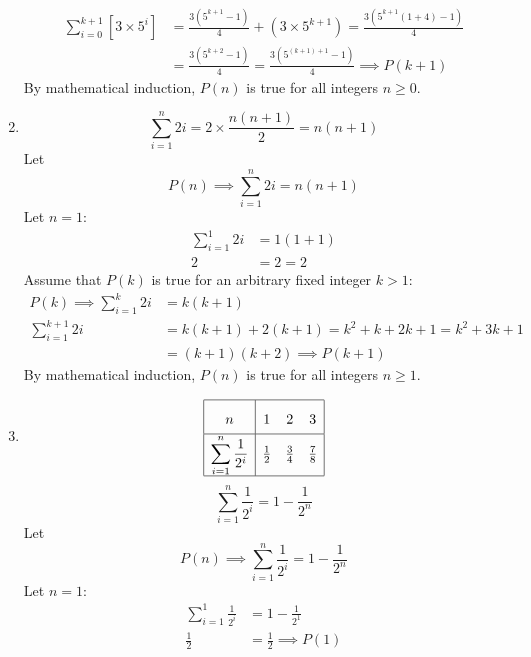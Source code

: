 \documentclass[12pt, A4]{article}
\begin{document}
\begin{enumerate}
\begin{align*}
							\sum_{i = 0}^{k + 1}\left[3 \times 5^i\right] &= \frac{3\left(5^{k + 1} - 1\right)}{4} + \left(3 \times 5^{k + 1}\right)
									= \frac{3\left(5^{k + 1}\left(1 + 4\right) - 1\right)}{4} \\
								&= \frac{3\left(5^{k + 2} - 1\right)}{4}
										= \frac{3\left(5^{(k + 1) + 1} - 1\right)}{4} 
										\implies P(k + 1)
						\end{align*}
						By mathematical induction, \(P(n)\) is true for all integers \(n \ge 0\).
				\setcounter{enumi}{8}
				\item
					\begin{tasks}
						\task
							\[\sum_{i = 1}^n 2i = 2 \times \frac{n(n + 1)}{2} = n(n + 1)\]
						\task
							Let
								\[P(n) \implies \sum_{i = 1}^n 2i = n(n + 1)\]
								Let \(n = 1\):
								\begin{align*}
									\sum_{i = 1}^1 2i &= 1(1 + 1) \\
									2 &= 2 = 2
								\end{align*}
								Assume that \(P(k)\) is true for an arbitrary fixed integer \(k > 1\):
								\begin{align*}
									P(k) \implies \sum_{i = 1}^k 2i &= k(k + 1) \\
									\sum_{i = 1}^{k + 1} 2i &= k(k + 1) + 2(k + 1) 
											= k^2 + k + 2k + 1
											= k^2 + 3k + 1 \\
										&= (k + 1)(k + 2) \implies P(k + 1)
								\end{align*}
								By mathematical induction, \(P(n)\) is true for all integers \(n \ge 1\).
					\end{tasks}
				\setcounter{enumi}{10}
				\item
					\begin{tasks}
						\task
							\[\def\arraystretch{2}\begin{array}{|c|ccc|}\hline
								n & 1 & 2 & 3 \\\hline
								\displaystyle \sum_{i = 1}^n \frac{1}{2^i} & \frac{1}{2} & \frac{3}{4} & \frac{7}{8} \\\hline
							\end{array}\]
							\[\sum_{i = 1}^n \frac{1}{2^i} = 1 - \frac{1}{2^n}\]
						\task
							Let
								\[P(n) \implies \sum_{i = 1}^n \frac{1}{2^i} = 1 - \frac{1}{2^n}\]
								Let \(n = 1\):
								\begin{align*}
									\sum_{i = 1}^1 \frac{1}{2^i} &= 1 - \frac{1}{2^1} \\
									\frac{1}{2} &= \frac{1}{2}
											\implies P(1)

\end{align*}
\end{tasks}
\end{enumerate}
\end{document}
